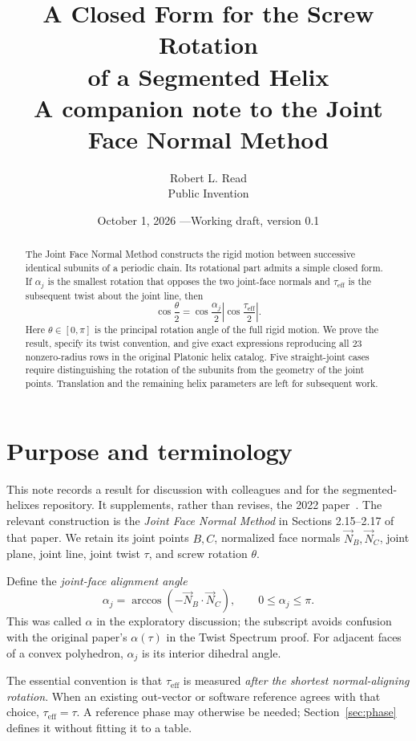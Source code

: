 \documentclass[11pt,letterpaper]{article}
\title{A Closed Form for the Screw Rotation\\of a Segmented Helix\\[0.4em]
  \large A companion note to the Joint Face Normal Method}
\author{Robert L. Read\\Public Invention}
\date{October 1, 2026 \quad---\quad Working draft, version 0.1}
\newcommand{\NB}{\vec N_B}
\newcommand{\NC}{\vec N_C}
\newcommand{\eff}{\tau_{\mathrm{eff}}}
\newcommand{\aj}{\alpha_j}
\begin{document}
\maketitle
\thispagestyle{empty}
\begin{abstract}
The Joint Face Normal Method constructs the rigid motion between successive
identical subunits of a periodic chain. Its rotational part admits a simple
closed form. If $\aj$ is the smallest rotation that opposes the two joint-face
normals and $\eff$ is the subsequent twist about the joint line, then
\[
  \boxed{\cos\frac{\theta}{2}
    =\cos\frac{\aj}{2}\left|\cos\frac{\eff}{2}\right|.}
\]
Here $\theta\in[0,\pi]$ is the principal rotation angle of the full rigid
motion. We prove the result, specify its twist convention, and give exact
expressions reproducing all 23 nonzero-radius rows in the original Platonic
helix catalog. Five straight-joint cases require distinguishing the rotation
of the subunits from the geometry of the joint points. Translation and the
remaining helix parameters are left for subsequent work.
\end{abstract}

\section{Purpose and terminology}
This note records a result for discussion with colleagues and for the
segmented-helixes repository. It supplements, rather than revises, the
2022 paper~\cite{read2022}. The relevant construction is the \emph{Joint Face
Normal Method} in Sections 2.15--2.17 of that paper. We retain its joint
points $B,C$, normalized face normals $\NB,\NC$, joint plane, joint line,
joint twist $\tau$, and screw rotation $\theta$.

Define the \emph{joint-face alignment angle}
\begin{equation}\label{eq:alpha}
  \aj=\arccos(-\NB\cdot\NC),\qquad 0\leq\aj\leq\pi.
\end{equation}
This was called $\alpha$ in the exploratory discussion; the subscript avoids
confusion with the original paper's $\alpha(\tau)$ in the Twist Spectrum proof.
For adjacent faces of a convex polyhedron, $\aj$ is its interior dihedral angle.

The essential convention is that $\eff$ is measured \emph{after the shortest
normal-aligning rotation}. When an existing out-vector or software reference
agrees with that choice, $\eff=\tau$. A reference phase may otherwise be
needed; Section~\ref{sec:phase} defines it without fitting it to a table.
\end{document}
